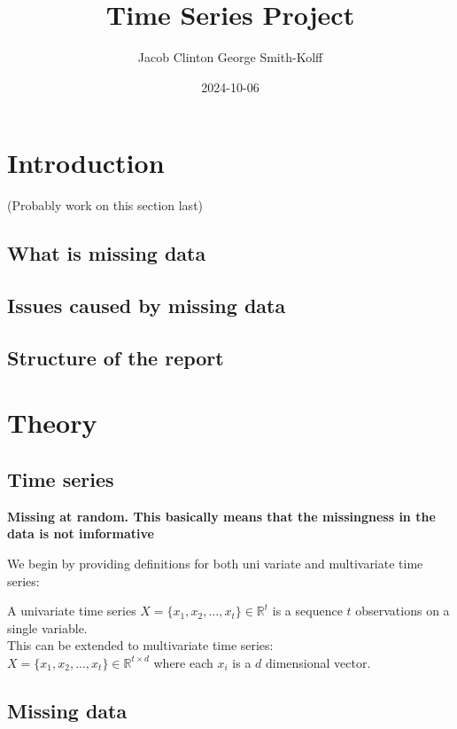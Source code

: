 \documentclass[
]{report}
\title{Time Series Project}
\author{Jacob Clinton George Smith-Kolff}
\date{2024-10-06}
\begin{document}
\maketitle

{
\setcounter{tocdepth}{1}
\tableofcontents
}
\chapter{Introduction}\label{introduction}

(Probably work on this section last)

\section{What is missing data}\label{what-is-missing-data}

\section{Issues caused by missing
data}\label{issues-caused-by-missing-data}

\section{Structure of the report}\label{structure-of-the-report}

\chapter{Theory}\label{theory}

\section{Time series}\label{time-series}

\textbf{Missing at random. This basically means that the missingness in the data is not imformative}

We begin by providing definitions for both uni variate and multivariate
time series:

A univariate time series \(X = \{x_1, x_2, ..., x_t\} \in \mathbb{R}^t\)
is a sequence \(t\) observations on a single variable.\\
This can be extended to multivariate time series:\\
\(X = \{x_1, x_2, ..., x_t\}\in \mathbb{R}^{t\times d}\) where each
\(x_i\) is a \(d\) dimensional vector.

\section{Missing data}\label{missing-data}
\end{document}
